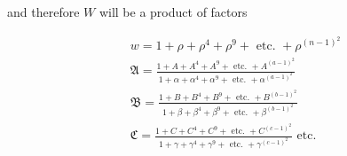 \documentclass{book}
\theoremstyle{plain}
\theoremstyle{remark}
\begin{document}
and therefore $W$ will be a product of factors

\begin{align*} 
& w = 1 + \rho + \rho^4 + \rho^9 + \textrm{ etc. } + \rho^{ (n-1)^2 }  \\
& \mathfrak{A} = \frac{ 1 + A + A^4 + A^9 + \textrm{ etc. } + A^{(a-1)^2}}{1 + \alpha + \alpha^4 + \alpha^9 + \textrm{ etc. } + \alpha^{(a-1)^2} }\\
& \mathfrak{B} = \frac{ 1 + B + B^4 + B^9 + \textrm{ etc. } + B^{(b-1)^2}}{1 + \beta + \beta^4 + \beta^9 + \textrm{ etc. } + \beta^{(b-1)^2}} \\
& \mathfrak{C} = \frac{ 1 + C + C^4 + C^9 + \textrm{ etc. } + C^{(c-1)^2}}{1 + \gamma + \gamma^4 + \gamma^9 + \textrm{ etc. } + \gamma^{(c-1)^2} } \textrm{ etc.}
\end{align*}
\end{document}
